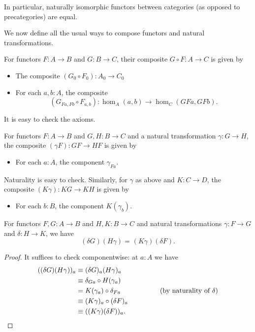 \documentclass{amsart}
\newcommand{\jdeq}{\equiv}      %
\newcommand{\id}[3][]{\ensuremath{#2 =_{#1} #3}\xspace}
\theoremstyle{definition}
\theoremstyle{remark}
\numberwithin{equation}{section}
\begin{document}
In particular, naturally isomorphic functors between categories (as opposed to precategories) are equal.

\medskip

We now define all the usual ways to compose functors and natural transformations.

\begin{defn}
  For functors $F:A\to B$ and $G:B\to C$, their composite $G\circ F:A\to C$ is given by
  \begin{itemize}
  \item The composite $(G_0\circ F_0) : A_0 \to C_0$
  \item For each $a,b:A$, the composite
    \[(G_{Fa,Fb}\circ F_{a,b}):\hom_A(a,b) \to \hom_C(GFa,GFb).\]
  \end{itemize}
  It is easy to check the axioms.
\end{defn}

\begin{defn}\label{def:whisker}
  For functors $F:A\to B$ and $G,H:B\to C$ and a natural transformation $\gamma:G\to H$, the composite $(\gamma F):GF\to HF$ is given by
  \begin{itemize}
  \item For each $a:A$, the component $\gamma_{Fa}$.
  \end{itemize}
  Naturality is easy to check.
  Similarly, for $\gamma$ as above and $K:C\to D$, the composite $(K\gamma):KG\to KH$ is given by
  \begin{itemize}
  \item For each $b:B$, the component $K(\gamma_b)$.
  \end{itemize}
\end{defn}

\begin{lem}\label{ct:interchange}
  For functors $F,G:A\to B$ and $H,K:B\to C$ and natural transformations $\gamma:F\to G$ and $\delta:H\to K$, we have
  \[\id{(\delta G)(H\gamma)}{(K\gamma)(\delta F)}.\]
\end{lem}
\begin{proof}
  It suffices to check componentwise: at $a:A$ we have
  \begin{align*}
    ((\delta G)(H\gamma))_a
    &\jdeq (\delta G)_{a}(H\gamma)_a\\
    &\jdeq \delta_{Ga}\circ H(\gamma_a)\\
    &= K(\gamma_a) \circ \delta_{Fa} \hspace{2cm}\text{(by naturality of $\delta$)}\\
    &\jdeq (K \gamma)_a\circ (\delta F)_a\\
    &\jdeq ((K \gamma)(\delta F))_a.\qedhere
  \end{align*}
\end{proof}
\end{document}
